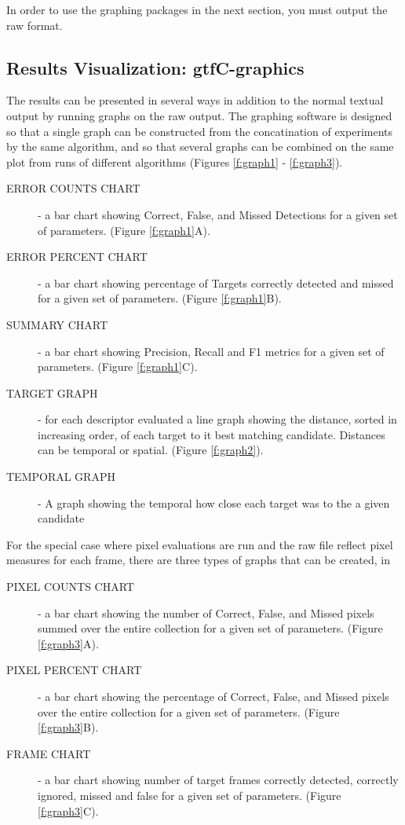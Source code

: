 In order to use the graphing packages in the next section, you must
output the raw format.

\subsection{Results Visualization: gtfC-graphics}

The results can be presented in several ways in addition to the normal
textual output by running graphs on the raw output.  The graphing
software is designed so that a single graph can be constructed from
the concatination of experiments by the same algorithm, and so that
several graphs can be combined on the same plot from runs of different
algorithms (Figures \ref{f:graph1} - \ref{f:graph3}).


\begin{description}
\item [ERROR COUNTS CHART] - a bar chart showing Correct, False, and Missed
Detections for a given set of parameters. (Figure \ref{f:graph1}A).

\item [ERROR PERCENT CHART] - a bar chart showing percentage of Targets
correctly detected and missed for a given set of
parameters. (Figure \ref{f:graph1}B).

\item [SUMMARY CHART] - a bar chart showing Precision, Recall and F1
metrics for a given set of parameters. (Figure \ref{f:graph1}C).

\item [TARGET GRAPH] - for each descriptor evaluated a line graph
showing the distance, sorted in increasing order, of each target to it
best matching candidate.  Distances can be temporal or
spatial. (Figure \ref{f:graph2}).

\item [TEMPORAL GRAPH] - A graph showing the temporal how close each target was to the a given candidate
\end{description}

For the special case where pixel evaluations are run and the raw file
reflect pixel measures for each frame, there are three types of graphs
that can be created, in

\begin{description}

\item [PIXEL COUNTS CHART] - a bar chart showing the number of
Correct, False, and Missed pixels summed over the entire collection
for a given set of parameters. (Figure \ref{f:graph3}A).

\item [PIXEL PERCENT CHART] - a bar chart showing the percentage of
Correct, False, and Missed pixels  over the entire collection
for a given set of parameters. (Figure \ref{f:graph3}B).

\item [FRAME CHART] - a bar chart showing number of target frames
correctly detected, correctly ignored, missed and false for a given
set of parameters. (Figure \ref{f:graph3}C).
\end{description}


